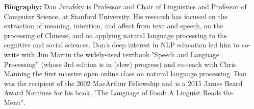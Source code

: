 \vfill
\noindent

{\bfseries Biography:} Dan Jurafsky is Professor and Chair of Linguistics and Professor
  of Computer Science, at Stanford University.  His research has
  focused on the extraction of meaning, intention, and affect from
  text and speech, on the processing of Chinese, and on applying
  natural language processing to the cognitive and social sciences.
  Dan's deep interest in NLP education led him to co-write with Jim
  Martin the widely-used textbook "Speech and Language Processing”
  (whose 3rd edition is in (slow) progress) and co-teach with Chris Manning
  the first massive open online class on natural language processing.
  Dan was the recipient of the 2002 MacArthur Fellowship and is a
  2015 James Beard Award Nominee for his book, "The Language of Food:
  A Linguist Reads the Menu".

\newpage
